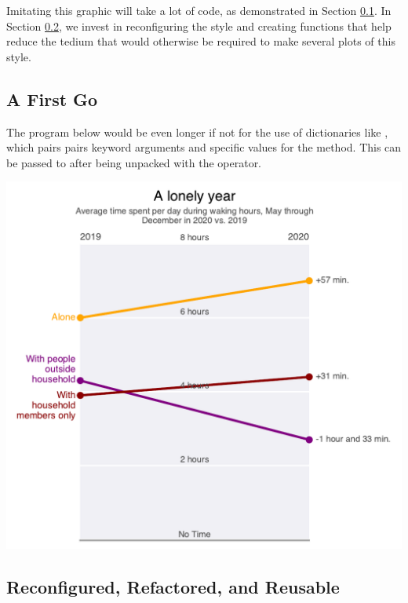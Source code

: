 Imitating this graphic will take a lot of code, as demonstrated in Section \ref{subsec:firstgo}. In Section \ref{subsec:rrr}, we invest in reconfiguring the style and creating functions that  help reduce the tedium that would otherwise be required to make several plots of this style. 

\subsection{A First Go}\label{subsec:firstgo}

The program below would be even longer if not for the use of dictionaries like , which pairs pairs keyword arguments and specific values for the  method. This can be passed to  after being unpacked with the \code{**} operator. 


\begin{center}
    \includegraphics[width = .8\textwidth]{figures/proseplots/nyt-rep1.pdf}
\end{center}

\subsection{Reconfigured, Refactored, and Reusable}\label{subsec:rrr}


